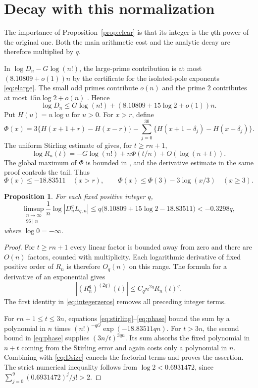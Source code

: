 \documentclass[11pt]{article}
\newtheorem{proposition}[theorem]{Proposition}
\theoremstyle{remark}
\numberwithin{equation}{section}
\begin{document}
\section{Decay with this normalization}\label{sec:decay}

The importance of Proposition~\ref{prop:clear} is that its integer is
the $q$th power of the original one. Both the main arithmetic cost
and the analytic decay are therefore multiplied by $q$.

In $\log D_n-G\log(n!)$, the large-prime contribution is at most
$(8.10809+o(1))n$ by the certificate \cite[(4.5)]{fifteen} for
the isolated-pole exponents \eqref{eq:elarge}. The small odd primes
contribute $o(n)$ and the prime $2$ contributes at most $15n\log2+o(n)$
\cite[Section~4 and Appendix~A]{fifteen}. Hence
\begin{equation}\label{eq:Dsize}
 \log D_n\le G\log(n!)
                +\left(8.10809+15\log2+o(1)\right)n.
\end{equation}
Put $H(u)=u\log u$ for $u>0$. For $x>r$, define
\[
 \Phi(x)=3\{H(x+1+r)-H(x-r)\}
          -\sum_{j=0}^{30}\{H(x+1-\delta_j)-H(x+\delta_j)\}.
\]
The uniform Stirling estimate of \cite[Section~4]{fifteen} gives,
for $t\ge rn+1$,
\begin{equation}\label{eq:stirling}
 \log R_n(t)=-G\log(n!)+n\Phi(t/n)+O(\log(n+t)).
\end{equation}
The global maximum of $\Phi$ is bounded in \cite[(4.9)]{fifteen},
and the derivative estimate in the same proof controls the tail. Thus
\begin{equation}\label{eq:phase}
 \Phi(x)\le-18.83511\quad(x>r),\qquad
 \Phi(x)\le\Phi(3)-3\log(x/3)\quad(x\ge3).
\end{equation}

\begin{proposition}\label{prop:decay}
For each fixed positive integer $q$,
\[
 \limsup_{\substack{n\to\infty\\96\mid n}}
       \frac1n\log|D_n^qL_{q,n}|
 \le q\bigl(8.10809+15\log2-18.83511\bigr)<-0.3298q,
\]
where $\log0=-\infty$.
\end{proposition}
\begin{proof}
For $t\ge rn+1$ every linear factor is bounded away from zero
and there are $O(n)$ factors, counted with multiplicity.
Each logarithmic derivative of fixed positive order of $R_n$
is therefore $O_q(n)$ on this range. The formula for a derivative
of an exponential gives
\[
 |(R_n^q)^{(2q)}(t)|\le C_q n^{2q}R_n(t)^q.
\]
The first identity in \eqref{eq:integerzeros} removes all preceding
integer terms.

For $rn+1\le t\le3n$, equations
\eqref{eq:stirling}--\eqref{eq:phase} bound the sum by a polynomial
in $n$ times $(n!)^{-qG}\exp(-18.83511qn)$.
For $t>3n$, the second bound in \eqref{eq:phase} supplies
$(3n/t)^{3qn}$. Its sum absorbs the fixed polynomial in $n+t$
coming from the Stirling error and again costs only a polynomial
in $n$. Combining with \eqref{eq:Dsize} cancels the factorial
terms and proves the assertion. The strict numerical inequality
follows from $\log2<0.6931472$, since
$\sum_{j=0}^9(0.6931472)^j/j!>2$.
\end{proof}
\end{document}
